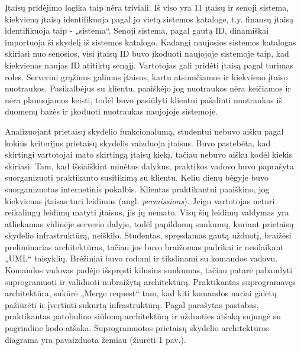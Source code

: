 \documentclass{VUMIFPSbakalaurinis}
\begin{document}
Įtaisų pridėjimo logika taip nėra triviali. Iš viso yra 11 įtaisų ir senoji sistema, kiekvieną įtaisą identifikuoja pagal jo vietą sistemos kataloge, t.y. finansų įtaisą identifikuoja taip - „sistema\prietaisuSkydelis{}“. Senoji sistema, pagal gautą ID, dinamiškai importuoja ši skydelį iš sistemos katalogo. Kadangi naujosios sistemos katalogas skiriasi nuo senosios, visi įtaisų ID buvo įkoduoti naujojoje sistemoje taip, kad kiekvienas naujas ID atitiktų senąjį. Vartotojas gali pridėti įtaisą pagal turimas roles. Serveriui grąžinus galimus įtaisus, kartu atsiunčiamos ir kiekvieno įtaiso nuotraukos. Pasikalbėjus su klientu, paaiškėjo jog nuotraukos nėra keičiamos ir nėra planuojamos keisti, todėl buvo pasiūlyti klientui pašalinti nuotraukas iš duomenų bazės ir įkoduoti nuotraukas naujojoje  sistemoje.

Analizuojant prietaisų skydelio funkcionalumą, studentui nebuvo aišku pagal kokius kriterijus prietaisų skydelis vaizduoja įtaisus. Buvo pastebėta, kad skirtingi vartotojai mato skirtingą įtaisų kiekį, tačiau nebuvo aišku kodėl kiekis skiriasi. Tam, kad išsiaiškint minėtus dalykus, praktikos vadovo buvo paprašyta suorganizuoti praktikanto susitikimą su klientu. Keliu dienų bėgyje buvo suorganizuotas internetinis pokalbis. Klientas praktikantui paaiškino, jog kiekvienas įtaisas turi leidimus (angl. \textit{permissions}). Jeigu vartotojas neturi reikalingų leidimų matyti įtaisus, jis jų nemato. Visų šių leidimų valdymas yra atliekamas vidinėje serverio dalyje, todėl papildomų sunkumų, kuriant prietaisų skydelio infrastruktūrą, neiškilo. Studentas, spręsdamas gautą užduotį, braižėsi preliminarias architektūras, tačiau jos buvo braižomas padrikai ir nesilaikant „UML“ taisyklių. Brėžiniai buvo rodomi ir tikslinami su komandos vadovu. Komandos vadovas padėjo išspręsti kilusius sunkumas, tačiau patarė pabandyti suprogramuoti ir validuoti nubraižytą architektūrą. Praktikantas suprogramavęs architektūra, sukūrė „Merge request“ tam, kad kiti komandos nariai galėtų pažiūrėti ir įvertinti sukurtą infrastruktūrą. Pagal parašytas pastabas, praktikantas patobulino siūlomą architektūrą ir užduoties atšaką sujungė su pagrindine kodo atšaka. Suprogramuotos prietaisų skydelio architektūros diagrama yra pavaizduota žemiau (žiūrėti 1 pav.).
\end{document}

